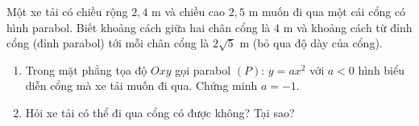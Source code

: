 \begin{bt}%
	Một xe tải có chiều rộng $2{,}4$ m và chiều cao $2{,}5$ m muốn đi qua một cái cổng có hình parabol. Biết khoảng cách giữa hai chân cổng là $4$ m và khoảng cách từ đỉnh cổng (đỉnh parabol) tới mỗi chân cổng là $2\sqrt{5}$ m (bỏ qua độ dày của cổng).
	\begin{enumerate}
		\item Trong mặt phẳng tọa độ $Oxy$ gọi parabol $(P)$: $y=ax^2$ với $a<0$ hình biểu diễn cổng mà xe tải muốn đi qua. Chứng minh $a=-1$.
		\item Hỏi xe tải có thể đi qua cổng có được không? Tại sao?
	\end{enumerate}
\end{bt}
